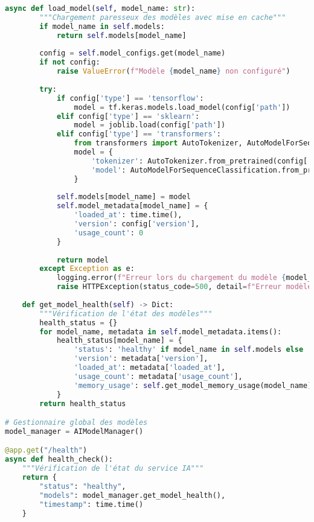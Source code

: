 \documentclass[12pt,a4paper]{report}
\begin{document}
\begin{lstlisting}[language=Python, caption=Service de modèles IA distribués]
    async def load_model(self, model_name: str):
        """Chargement paresseux des modèles avec mise en cache"""
        if model_name in self.models:
            return self.models[model_name]
        
        config = self.model_configs.get(model_name)
        if not config:
            raise ValueError(f"Modèle {model_name} non configuré")
        
        try:
            if config['type'] == 'tensorflow':
                model = tf.keras.models.load_model(config['path'])
            elif config['type'] == 'sklearn':
                model = joblib.load(config['path'])
            elif config['type'] == 'transformers':
                from transformers import AutoTokenizer, AutoModelForSequenceClassification
                model = {
                    'tokenizer': AutoTokenizer.from_pretrained(config['path']),
                    'model': AutoModelForSequenceClassification.from_pretrained(config['path'])
                }
            
            self.models[model_name] = model
            self.model_metadata[model_name] = {
                'loaded_at': time.time(),
                'version': config['version'],
                'usage_count': 0
            }
            
            return model
        except Exception as e:
            logging.error(f"Erreur lors du chargement du modèle {model_name}: {e}")
            raise HTTPException(status_code=500, detail=f"Erreur modèle: {str(e)}")
    
    def get_model_health(self) -> Dict:
        """Vérification de l'état des modèles"""
        health_status = {}
        for model_name, metadata in self.model_metadata.items():
            health_status[model_name] = {
                'status': 'healthy' if model_name in self.models else 'unloaded',
                'version': metadata['version'],
                'loaded_at': metadata['loaded_at'],
                'usage_count': metadata['usage_count'],
                'memory_usage': self.get_model_memory_usage(model_name)
            }
        return health_status

# Gestionnaire global des modèles
model_manager = AIModelManager()

@app.get("/health")
async def health_check():
    """Vérification de l'état du service IA"""
    return {
        "status": "healthy",
        "models": model_manager.get_model_health(),
        "timestamp": time.time()
    }
\end{lstlisting}
\end{document}
